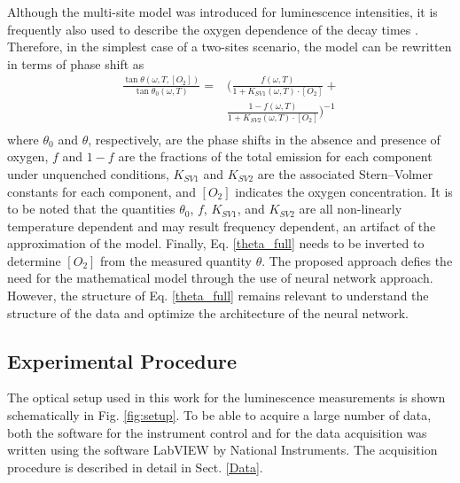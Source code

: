 \documentclass[9pt,twocolumn,twoside,pdftex]{optica}
\begin{document}
Although the multi-site model was introduced for luminescence intensities, it is frequently also used to describe the oxygen dependence of the decay times \cite{Demas1995,Quaranta2012}. Therefore, in the simplest case of a two-sites scenario, the model can be rewritten in terms of phase shift as \cite{Michelucci2019}
\begin{equation}
\begin{aligned}
\frac{\tan \theta (\omega, T, [O_2])}{\tan \theta_0 (\omega, T)} =& \bigg( \frac{f (\omega , T) }{1+K_{SV1} (\omega , T) \cdot \left[O_2\right]}+ \\
&\frac{1-f (\omega , T) }{1+K_{SV2} (\omega , T) \cdot \left[O_2\right]} \bigg)^{-1} \\
\label{theta_full}
\end{aligned}
\end{equation}
where $\theta_0$ and $\theta$, respectively, are the phase shifts in the absence and presence of oxygen, $f$ and $1-f$ are the fractions of the total emission for each component under unquenched conditions, $K_{SV1}$ and $K_{SV2}$ are the associated Stern–Volmer constants for each component, and $\left[O_2\right]$ indicates the oxygen concentration. It is to be noted that the quantities $\theta_0$, $f$, $K_{SV1}$, and $K_{SV2}$ are all non-linearly temperature dependent \cite{Ogurtsov2006,lo2008,Zaitsev2016} and may result frequency dependent, an artifact of the approximation of the model. Finally, Eq. \ref{theta_full} needs to be inverted to determine $[O_2]$ from the measured quantity $\theta$. The proposed approach defies the need for the mathematical model through the use of neural network approach. However, the structure of Eq. \ref{theta_full} remains relevant to understand the structure of the data and optimize the architecture of the neural network.


\subsection{Experimental Procedure}
\label{Experimental}

The optical setup used in this work for the luminescence measurements is shown schematically in Fig. \ref{fig:setup}. To be able to acquire a large number of data, both the software for the instrument control and for the data acquisition was written using the software LabVIEW by National Instruments. The acquisition procedure is described in detail in Sect. \ref{Data}.
\end{document}
